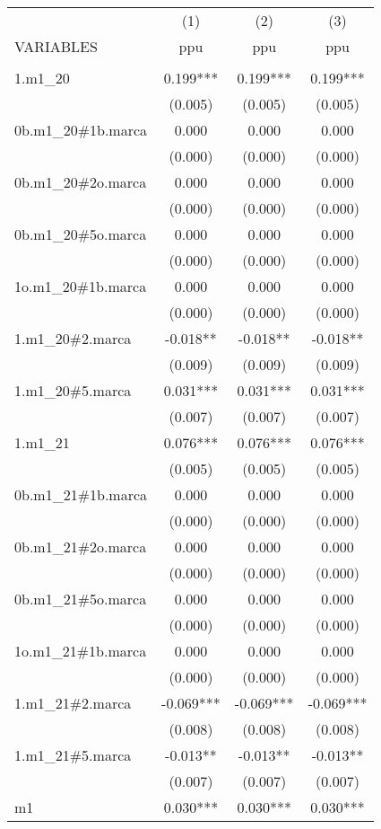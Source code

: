 \begin{tabular}{lccc} \hline
 & (1) & (2) & (3) \\
VARIABLES & ppu & ppu & ppu \\ \hline
 &  &  &  \\
1.m1\_20 & 0.199*** & 0.199*** & 0.199*** \\
 & (0.005) & (0.005) & (0.005) \\
0b.m1\_20\#1b.marca & 0.000 & 0.000 & 0.000 \\
 & (0.000) & (0.000) & (0.000) \\
0b.m1\_20\#2o.marca & 0.000 & 0.000 & 0.000 \\
 & (0.000) & (0.000) & (0.000) \\
0b.m1\_20\#5o.marca & 0.000 & 0.000 & 0.000 \\
 & (0.000) & (0.000) & (0.000) \\
1o.m1\_20\#1b.marca & 0.000 & 0.000 & 0.000 \\
 & (0.000) & (0.000) & (0.000) \\
1.m1\_20\#2.marca & -0.018** & -0.018** & -0.018** \\
 & (0.009) & (0.009) & (0.009) \\
1.m1\_20\#5.marca & 0.031*** & 0.031*** & 0.031*** \\
 & (0.007) & (0.007) & (0.007) \\
1.m1\_21 & 0.076*** & 0.076*** & 0.076*** \\
 & (0.005) & (0.005) & (0.005) \\
0b.m1\_21\#1b.marca & 0.000 & 0.000 & 0.000 \\
 & (0.000) & (0.000) & (0.000) \\
0b.m1\_21\#2o.marca & 0.000 & 0.000 & 0.000 \\
 & (0.000) & (0.000) & (0.000) \\
0b.m1\_21\#5o.marca & 0.000 & 0.000 & 0.000 \\
 & (0.000) & (0.000) & (0.000) \\
1o.m1\_21\#1b.marca & 0.000 & 0.000 & 0.000 \\
 & (0.000) & (0.000) & (0.000) \\
1.m1\_21\#2.marca & -0.069*** & -0.069*** & -0.069*** \\
 & (0.008) & (0.008) & (0.008) \\
1.m1\_21\#5.marca & -0.013** & -0.013** & -0.013** \\
 & (0.007) & (0.007) & (0.007) \\
m1 & 0.030*** & 0.030*** & 0.030*** \\

\end{tabular}
